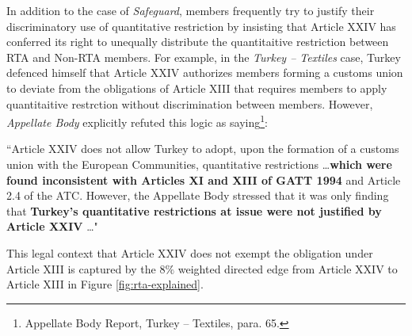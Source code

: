 In addition to the case of \textit{Safeguard},
members frequently try to justify their discriminatory
use of quantitative restriction by insisting that Article XXIV
has conferred its right to unequally distribute the quantitaitive restriction between RTA and Non-RTA members.
For example, in the \textit{Turkey – Textiles} case, Turkey defenced himself that Article XXIV authorizes
members forming a customs union to deviate from the obligations of Article XIII that requires members to apply quantitaitive restrction without discrimination between members.
However, \textit{Appellate Body} explicitly refuted this logic as saying\footnote{Appellate Body Report, Turkey – Textiles, para. 65.}:
\begin{displayquote}[][]
   ``Article XXIV does not allow Turkey to adopt, upon the
   formation of a customs union with the European Communities, quantitative restrictions \ldots \textbf{which
   were found inconsistent with Articles XI and XIII of GATT 1994} and Article 2.4 of the ATC.
   However, the Appellate Body stressed that it was only finding that \textbf{Turkey's quantitative
   restrictions at issue were not justified by Article XXIV} \ldots"
\end{displayquote}
This legal context that Article XXIV does not exempt the obligation under Article XIII is captured by the $8\%$ weighted directed edge from Article XXIV to Article XIII in Figure \ref{fig:rta-explained}.
 
 
 
 
 
 

